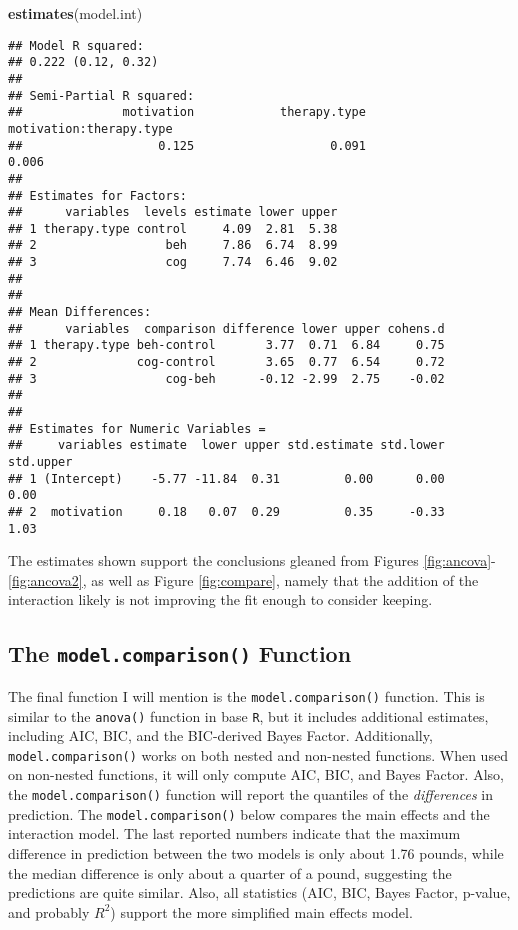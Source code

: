 \documentclass[
  english,
  man]{apa6}
\newenvironment{Shaded}{\begin{snugshade}}{\end{snugshade}}
\newcommand{\KeywordTok}[1]{\textcolor[rgb]{0.13,0.29,0.53}{\textbf{#1}}}
\newcommand{\NormalTok}[1]{#1}
\begin{document}
\small

\begin{Shaded}
\begin{Highlighting}[]
\KeywordTok{estimates}\NormalTok{(model.int)}
\end{Highlighting}
\end{Shaded}

\begin{verbatim}
## Model R squared:
## 0.222 (0.12, 0.32)
## 
## Semi-Partial R squared:
##              motivation            therapy.type motivation:therapy.type 
##                   0.125                   0.091                   0.006 
## 
## Estimates for Factors:
##      variables  levels estimate lower upper
## 1 therapy.type control     4.09  2.81  5.38
## 2                  beh     7.86  6.74  8.99
## 3                  cog     7.74  6.46  9.02
## 
## 
## Mean Differences:
##      variables  comparison difference lower upper cohens.d
## 1 therapy.type beh-control       3.77  0.71  6.84     0.75
## 2              cog-control       3.65  0.77  6.54     0.72
## 3                  cog-beh      -0.12 -2.99  2.75    -0.02
## 
## 
## Estimates for Numeric Variables = 
##     variables estimate  lower upper std.estimate std.lower std.upper
## 1 (Intercept)    -5.77 -11.84  0.31         0.00      0.00      0.00
## 2  motivation     0.18   0.07  0.29         0.35     -0.33      1.03
\end{verbatim}

\normalsize
The estimates shown support the conclusions gleaned from Figures \ref{fig:ancova}-\ref{fig:ancova2}, as well as Figure \ref{fig:compare}, namely that the addition of the interaction likely is not improving the fit enough to consider keeping.

\hypertarget{the-model.comparison-function}{%
\subsection{\texorpdfstring{The \texttt{model.comparison()} Function}{The model.comparison() Function}}\label{the-model.comparison-function}}

The final function I will mention is the \texttt{model.comparison()} function. This is similar to the \texttt{anova()} function in base \texttt{R}, but it includes additional estimates, including AIC, BIC, and the BIC-derived Bayes Factor. Additionally, \texttt{model.comparison()} works on both nested and non-nested functions. When used on non-nested functions, it will only compute AIC, BIC, and Bayes Factor. Also, the \texttt{model.comparison()} function will report the quantiles of the \emph{differences} in prediction. The \texttt{model.comparison()} below compares the main effects and the interaction model. The last reported numbers indicate that the maximum difference in prediction between the two models is only about 1.76 pounds, while the median difference is only about a quarter of a pound, suggesting the predictions are quite similar. Also, all statistics (AIC, BIC, Bayes Factor, p-value, and probably \(R^2\)) support the more simplified main effects model.
\end{document}
